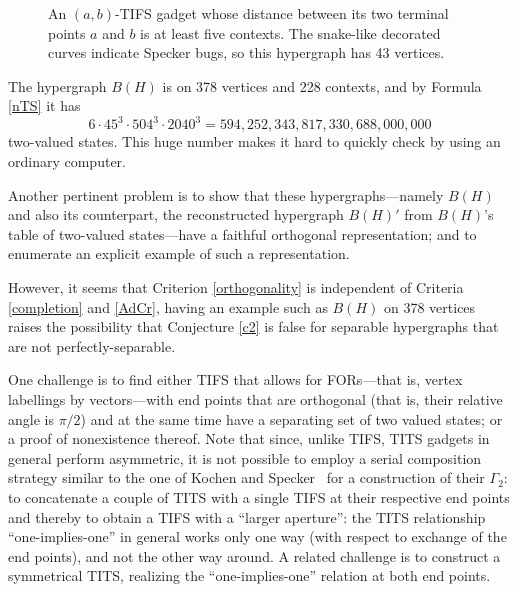 \documentclass[%
12pt,
prereprint,
showpacs,
showkeys,
preprintnumbers,
amsmath,amssymb,
aps,
pra,
longbibliography,
notitlepage
]{revtex4-1}
\theoremstyle{definition}
\begin{document}
\begin{figure}
\begin{center}
		\end{center}
		\caption{\label{Baba-Taher}
			An $(a,b)$-TIFS gadget whose distance between its two terminal points $a$ and $b$ is at least five contexts. The snake-like decorated curves indicate Specker bugs, so this hypergraph has 43 vertices.
		}
	\end{figure}
	
	The hypergraph $B(H)$ is on 378 vertices and 228 contexts, and by Formula \ref{nTS} it has $$6\cdot 45^3\cdot 504^3\cdot 2040 ^3=594,252,343,817,330,688,000,000$$ two-valued states. This huge number makes it hard to quickly check by using an ordinary computer.
	
	Another pertinent problem is to show that these hypergraphs---namely $B(H)$ and also its counterpart, the reconstructed hypergraph $B(H)'$ from $B(H)$'s table of two-valued states---have a faithful orthogonal representation; and to enumerate an explicit example of such a representation.
	
	However, it seems that Criterion \ref{orthogonality} is independent of Criteria \ref{completion} and \ref{AdCr}, having an example such as $B(H)$ on 378 vertices raises the possibility that Conjecture \ref{c2} is false for separable hypergraphs that are not perfectly-separable.
	
	One challenge is to find either TIFS that allows for FORs---that is, vertex labellings by vectors---with end points that are orthogonal (that is, their relative angle is $\pi/2$) and at the same time have a separating set of two valued states; or a proof of nonexistence thereof.  Note that since, unlike TIFS,  TITS gadgets in general perform asymmetric, it is not possible to employ a serial composition strategy similar to the one of Kochen and Specker~\cite{kochen1} for a construction of their $\Gamma_2$:  to concatenate a couple of TITS with a single TIFS at their respective end points and thereby to obtain a TIFS with a ``larger aperture'': the TITS relationship ``one-implies-one'' in general works only one way (with respect to exchange of the end points), and not the other way around. A related challenge is to construct a symmetrical TITS, realizing the ``one-implies-one'' relation at both end points.
	
\end{document}
